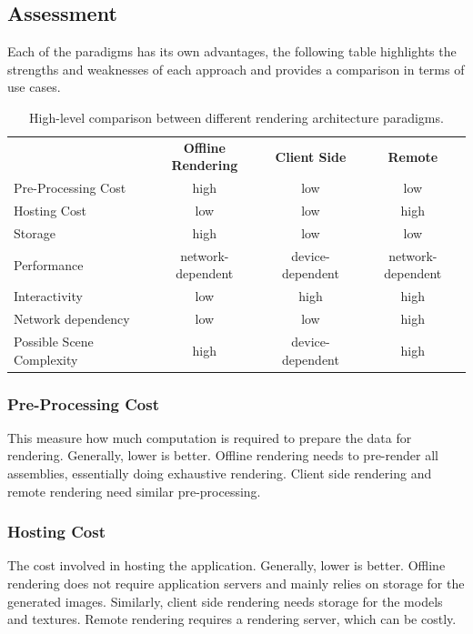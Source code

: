 \subsection*{Assessment}

Each of the paradigms has its own advantages, the following table highlights the strengths and weaknesses of each approach and provides a comparison in terms of use cases.

\begin{table}[H]\centering
  \begin{tabular}{@{}lccc@{}}\toprule
   & \bfseries Offline Rendering & \bfseries Client Side & \bfseries Remote \\
  Pre-Processing Cost & high & low & low \\
  Hosting Cost & low & low & high \\
  Storage & high & low & low \\
  Performance & network-dependent & device-dependent & network-dependent \\
  Interactivity & low & high & high \\
  Network dependency & low & low & high \\
  Possible Scene Complexity & high & device-dependent & high \\
  \bottomrule
  \end{tabular}
  \caption{High-level comparison between different rendering architecture paradigms.}
\end{table}

\subsubsection{Pre-Processing Cost}

This measure how much computation is required to prepare the data for rendering. Generally, lower is better. Offline rendering needs to pre-render all assemblies, essentially doing exhaustive rendering. Client side rendering and remote rendering need similar pre-processing.

\subsubsection{Hosting Cost}

The cost involved in hosting the application. Generally, lower is better. Offline rendering does not require application servers and mainly relies on storage for the generated images. Similarly, client side rendering needs storage for the models and textures. Remote rendering requires a rendering server, which can be costly.

